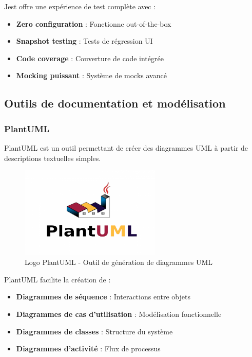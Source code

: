\documentclass[12pt,a4paper]{report}
\begin{document}
Jest offre une expérience de test complète avec :
\begin{itemize}
    \item \textbf{Zero configuration} : Fonctionne out-of-the-box
    \item \textbf{Snapshot testing} : Tests de régression UI
    \item \textbf{Code coverage} : Couverture de code intégrée
    \item \textbf{Mocking puissant} : Système de mocks avancé
\end{itemize}

\subsection{Outils de documentation et modélisation}

\subsubsection{PlantUML}

PlantUML est un outil permettant de créer des diagrammes UML à partir de descriptions textuelles simples.

\begin{figure}[htbp]
    \centering
    \includegraphics[width=0.6\textwidth]{latex_media/media/plantUML.png}
    \caption{Logo PlantUML - Outil de génération de diagrammes UML}
    \label{fig:plantuml-logo}
\end{figure}

PlantUML facilite la création de :
\begin{itemize}
    \item \textbf{Diagrammes de séquence} : Interactions entre objets
    \item \textbf{Diagrammes de cas d'utilisation} : Modélisation fonctionnelle
    \item \textbf{Diagrammes de classes} : Structure du système
    \item \textbf{Diagrammes d'activité} : Flux de processus
\end{itemize}
\end{document}
